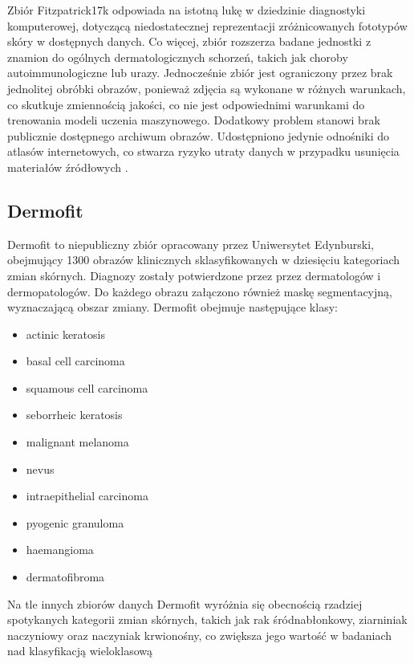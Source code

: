 Zbiór Fitzpatrick17k odpowiada na istotną lukę w dziedzinie diagnostyki komputerowej, dotyczącą niedostatecznej reprezentacji zróżnicowanych fototypów skóry w dostępnych danych.
Co więcej, zbiór rozszerza badane jednostki z znamion do ogólnych dermatologicznych schorzeń, takich jak choroby autoimmunologiczne lub urazy.
Jednocześnie zbiór jest ograniczony przez brak jednolitej obróbki obrazów, ponieważ zdjęcia są wykonane w różnych warunkach, co skutkuje zmiennością jakości, co nie jest odpowiednimi warunkami do trenowania modeli uczenia maszynowego.
Dodatkowy problem stanowi brak publicznie dostępnego archiwum obrazów.
Udostępniono jedynie odnośniki do atlasów internetowych, co stwarza ryzyko utraty danych w przypadku usunięcia materiałów źródłowych \cite{groh2021evaluating}.

\subsection{Dermofit}
Dermofit to niepubliczny zbiór opracowany przez Uniwersytet Edynburski, obejmujący 1300 obrazów klinicznych sklasyfikowanych w dziesięciu kategoriach zmian skórnych.
Diagnozy zostały potwierdzone przez przez dermatologów i dermopatologów.
Do każdego obrazu załączono również maskę segmentacyjną, wyznaczającą obszar zmiany.
Dermofit obejmuje następujące klasy:
\begin{itemize}
	\item actinic keratosis
	\item basal cell carcinoma
	\item squamous cell carcinoma
	\item seborrheic keratosis
	\item malignant melanoma
	\item nevus
	\item intraepithelial carcinoma
	\item pyogenic granuloma
	\item haemangioma
	\item dermatofibroma
\end{itemize}
Na tle innych zbiorów danych Dermofit wyróżnia się obecnością rzadziej spotykanych kategorii zmian skórnych, takich jak rak śródnabłonkowy, ziarniniak naczyniowy oraz naczyniak krwionośny, co zwiększa jego wartość w badaniach nad klasyfikacją wieloklasową \cite{Dermofit, inbook}

